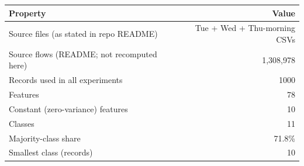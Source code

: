 \begin{tabular}{lr}
\toprule
Property & Value \\
\midrule
Source files (as stated in repo README) & Tue + Wed + Thu-morning CSVs \\
Source flows (README; not recomputed here) & 1,308,978 \\
Records used in all experiments & 1000 \\
Features & 78 \\
Constant (zero-variance) features & 10 \\
Classes & 11 \\
Majority-class share & 71.8\% \\
Smallest class (records) & 10 \\
\bottomrule
\end{tabular}
